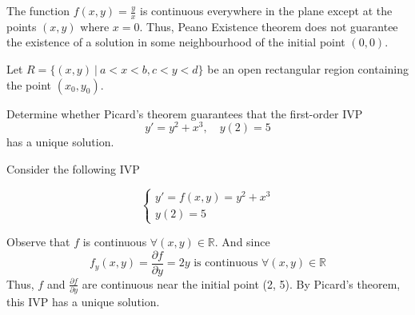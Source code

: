 \begin{remark}
    The function $f(x,y) = \frac{y}{x}$ is continuous everywhere in the plane except
    at the points $(x, y)$ where $x=0$. Thus, Peano Existence theorem does not guarantee 
    the existence of a solution in some neighbourhood of the initial point $(0,0)$.
\end{remark}

\begin{theorem}
    Let $R = \{(x,y) \> | \> a < x < b, c < y < d\}$ be an open rectangular region 
    containing the point $(x_0, y_0)$.

    
\end{theorem}

\begin{example}
    Determine whether Picard's theorem guarantees that the first-order IVP
    \[
        y' = y^2 + x^3, \quad y(2) = 5
    \]
    has a unique solution.
\end{example}
\begin{solution}
    Consider the following IVP

    \[
        \begin{cases}
            y' = f(x,y) = y^2 + x^3\\
            y(2) = 5
        \end{cases}
    \]

    Observe that $f$ is continuous $\forall (x,y) \in \mathbb{R}$. And since
    \[
        f_y(x, y) = \frac{\partial f}{\partial y}=2y \text{ is continuous } \forall (x,y) \in \mathbb{R}
    \]
    Thus, $f$ and $\frac{\partial f}{\partial y}$ are continuous near the initial point (2, 5). 
    By Picard's theorem, this IVP has a unique solution.
\end{solution}